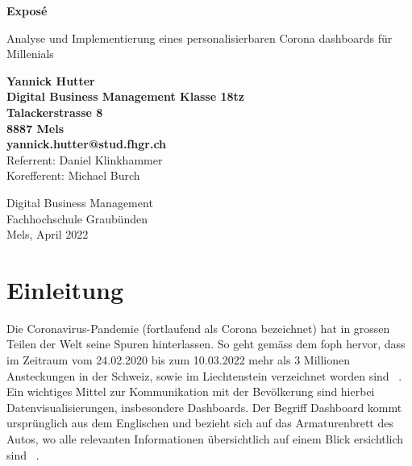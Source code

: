 \documentclass[12pt, oneside]{article}
\begin{document}
\begin{titlepage}
	\begin{center}
		\Huge
		\textbf{Exposé}
		
		\vspace{0.5cm}
		\LARGE
		Analyse und Implementierung eines personalisierbaren Corona dashboards für Millenials
		
		\vspace{1.5cm}
		\normalsize
		\textbf{Yannick Hutter}\\
		\textbf{Digital Business Management Klasse 18tz}\\
		\textbf{Talackerstrasse 8}\\
		\textbf{8887 Mels}\\
		\textbf{yannick.hutter@stud.fhgr.ch}\\

		
		\vfill
		Referrent: Daniel Klinkhammer\\
		Korefferent: Michael Burch\\
		
		\vspace{0.8cm}
		
		
		Digital Business Management\\
		Fachhochschule Graubünden\\
		Mels, April 2022
	\end{center}
\end{titlepage}



\tableofcontents
\listoffigures
\listoftables
\printglossaries



\clearpage
{}
\setcounter{page}{2}

\section{Einleitung}
Die Coronavirus-Pandemie (fortlaufend als Corona bezeichnet) hat in grossen Teilen der Welt seine Spuren hinterlassen. So geht gemäss dem \Gls{foph} hervor, dass im Zeitraum vom 24.02.2020 bis zum 10.03.2022 mehr als 3 Millionen Ansteckungen in der Schweiz, sowie im Liechtenstein verzeichnet worden sind ~\citep{FOPH.13.03.2022}. Ein wichtiges Mittel zur Kommunikation mit der Bevölkerung sind hierbei Datenvisualisierungen, insbesondere Dashboards.
Der Begriff Dashboard kommt ursprünglich aus dem Englischen und bezieht sich auf das Armaturenbrett des Autos, wo alle relevanten Informationen übersichtlich auf einem Blick ersichtlich sind ~\citep{Duden.18.04.2022}.\\
\end{document}
